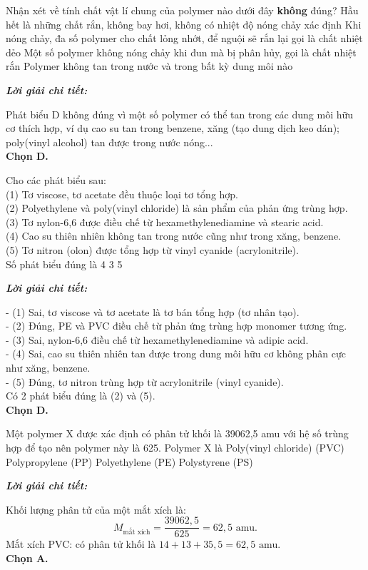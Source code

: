 \documentclass[11pt,a4paper]{article}
\def\loigiai#1{
\par\begingroup\color{blue!80!black}\small
\noindent\textbf{\textit{Lời giải chi tiết:}}\par
#1\par\endgroup}
\begin{document}
\begin{ex}
Nhận xét về tính chất vật lí chung của polymer nào dưới đây \textbf{không} đúng?
\choice
{Hầu hết là những chất rắn, không bay hơi, không có nhiệt độ nóng chảy xác định}
{Khi nóng chảy, đa số polymer cho chất lỏng nhớt, để nguội sẽ rắn lại gọi là chất nhiệt dẻo}
{Một số polymer không nóng chảy khi đun mà bị phân hủy, gọi là chất nhiệt rắn}
{\True Polymer không tan trong nước và trong bất kỳ dung môi nào}
\loigiai{
Phát biểu D không đúng vì một số polymer có thể tan trong các dung môi hữu cơ thích hợp, ví dụ cao su tan trong benzene, xăng (tạo dung dịch keo dán); poly(vinyl alcohol) tan được trong nước nóng...\\
\textbf{Chọn D.}}
\end{ex}

\begin{ex}
Cho các phát biểu sau:\\
(1) Tơ viscose, tơ acetate đều thuộc loại tơ tổng hợp.\\
(2) Polyethylene và poly(vinyl chloride) là sản phẩm của phản ứng trùng hợp.\\
(3) Tơ nylon-6,6 được điều chế từ hexamethylenediamine và stearic acid.\\
(4) Cao su thiên nhiên không tan trong nước cũng như trong xăng, benzene.\\
(5) Tơ nitron (olon) được tổng hợp từ vinyl cyanide (acrylonitrile).\\
Số phát biểu đúng là
\choice
{4}
{3}
{5}
{}
\loigiai{
- (1) Sai, tơ viscose và tơ acetate là tơ bán tổng hợp (tơ nhân tạo).\\
- (2) Đúng, PE và PVC điều chế từ phản ứng trùng hợp monomer tương ứng.\\
- (3) Sai, nylon-6,6 điều chế từ hexamethylenediamine và adipic acid.\\
- (4) Sai, cao su thiên nhiên tan được trong dung môi hữu cơ không phân cực như xăng, benzene.\\
- (5) Đúng, tơ nitron trùng hợp từ acrylonitrile (vinyl cyanide).\\
Có 2 phát biểu đúng là (2) và (5).\\
\textbf{Chọn D.}}
\end{ex}

\begin{ex}
Một polymer X được xác định có phân tử khối là 39062,5 amu với hệ số trùng hợp để tạo nên polymer này là 625. Polymer X là
\choice
{\True Poly(vinyl chloride) (PVC)}
{Polypropylene (PP)}
{Polyethylene (PE)}
{Polystyrene (PS)}
\loigiai{
Khối lượng phân tử của một mắt xích là:
$$M_{\text{mắt xích}} = \frac{39062{,}5}{625} = 62{,}5\text{ amu.}$$
Mắt xích PVC: \ce{-CH2-CHCl-} có phân tử khối là $14 + 13 + 35{,}5 = 62{,}5\text{ amu}$.\\
\textbf{Chọn A.}}
\end{ex}
\end{document}
